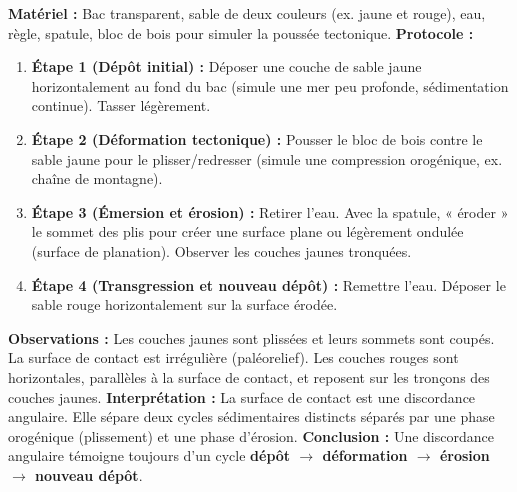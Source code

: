 \documentclass[11pt]{article}
\newcommand{\cle}[1]{{\popxbold\color{popdark}#1}}
\begin{document}
\begin{experience}
\textbf{Matériel :} Bac transparent, sable de deux couleurs (ex. jaune et rouge), eau, règle, spatule, bloc de bois pour simuler la poussée tectonique.
\textbf{Protocole :}
\begin{enumerate}
    \item \textbf{Étape 1 (Dépôt initial) :} Déposer une couche de sable jaune horizontalement au fond du bac (simule une mer peu profonde, sédimentation continue). Tasser légèrement.
    \item \textbf{Étape 2 (Déformation tectonique) :} Pousser le bloc de bois contre le sable jaune pour le plisser/redresser (simule une compression orogénique, ex. chaîne de montagne).
    \item \textbf{Étape 3 (Émersion et érosion) :} Retirer l'eau. Avec la spatule, « éroder » le sommet des plis pour créer une surface plane ou légèrement ondulée (surface de \cle{planation}). Observer les couches jaunes tronquées.
    \item \textbf{Étape 4 (Transgression et nouveau dépôt) :} Remettre l'eau. Déposer le sable rouge horizontalement sur la surface érodée.
\end{enumerate}
\textbf{Observations :} Les couches jaunes sont plissées et leurs sommets sont coupés. La surface de contact est irrégulière (paléorelief). Les couches rouges sont horizontales, parallèles à la surface de contact, et reposent sur les tronçons des couches jaunes.
\textbf{Interprétation :} La surface de contact est une discordance angulaire. Elle sépare deux cycles sédimentaires distincts séparés par une phase orogénique (plissement) et une phase d'érosion.
\textbf{Conclusion :} Une discordance angulaire témoigne toujours d'un cycle \textbf{dépôt $\rightarrow$ déformation $\rightarrow$ érosion $\rightarrow$ nouveau dépôt}.
\end{experience}
\end{document}
